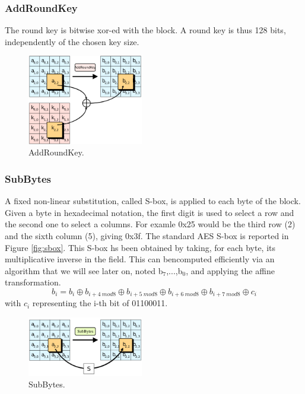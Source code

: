 \documentclass[a4paper, 12pt]{report}
\begin{document}
\subsubsection{AddRoundKey}
The round key is bitwise xor-ed with the block. A round key is thus 128 bits, independently of the chosen key size. 

\begin{figure}
	\includegraphics[width=0.45\textwidth]{images/Lec8/AddRoundKey.png}
	\caption{AddRoundKey.}
	\label{fig:addroundkey}
\end{figure}
\subsubsection{SubBytes}
A fixed non-linear substitution, called S-box, is applied to each byte of the block. Given a byte in hexadecimal notation, the first digit is used to select a row and the second one to select a columns. For examle 0x25 would be the third row (2) and the sixth column (5), giving 0x3f. The standard AES S-box is reported in Figure \ref{fig:sbox}. This S-box hs been obtained by taking, for each byte, its multiplicative inverse in the field. This can bencomputed efficiently via an algorithm that we will see later on, noted b$_7$,...,b$_0$, and applying the affine transformation.
\[b_i=b_i \oplus b_{i+4 \ mod8}\oplus b_{i+5 \ mod8}\oplus b_{i+6 \ mod8}\oplus b_{i+7 \ mod8}\oplus c_i\]
with $c_i$ representing the i-th bit of 01100011.\\

\begin{figure}
	\includegraphics[width=0.45\textwidth]{images/Lec8/SubBytes.png}
	\caption{SubBytes.}
	\label{fig:subbytes}
\end{figure}
\end{document}
